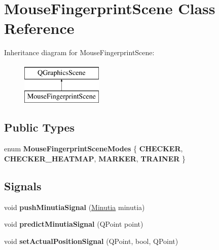 \hypertarget{class_mouse_fingerprint_scene}{}\section{Mouse\+Fingerprint\+Scene Class Reference}
\label{class_mouse_fingerprint_scene}
Inheritance diagram for Mouse\+Fingerprint\+Scene\+:\begin{figure}[H]
\begin{center}
\leavevmode
\includegraphics[height=2.000000cm]{class_mouse_fingerprint_scene}
\end{center}
\end{figure}
\subsection*{Public Types}
\begin{DoxyCompactItemize}
\item 
\mbox{\label{class_mouse_fingerprint_scene_a1fd25b04dde62c0c5ea8fc6c61a25596}} 
enum {\bfseries Mouse\+Fingerprint\+Scene\+Modes} \{ {\bfseries C\+H\+E\+C\+K\+ER}, 
{\bfseries C\+H\+E\+C\+K\+E\+R\+\_\+\+H\+E\+A\+T\+M\+AP}, 
{\bfseries M\+A\+R\+K\+ER}, 
{\bfseries T\+R\+A\+I\+N\+ER}
 \}
\end{DoxyCompactItemize}
\subsection*{Signals}
\begin{DoxyCompactItemize}
\item 
\mbox{\label{class_mouse_fingerprint_scene_ad8fea299e9d535defe84618f6b36059a}} 
void {\bfseries push\+Minutia\+Signal} (\mbox{\hyperlink{class_minutia}{Minutia}} minutia)
\item 
\mbox{\label{class_mouse_fingerprint_scene_a6091550d4b052dbb2342d58ec6e840b1}} 
void {\bfseries predict\+Minutia\+Signal} (Q\+Point point)
\item 
\mbox{\label{class_mouse_fingerprint_scene_afa954f2a2ab304daf78abbcd2110dcc1}} 
void {\bfseries set\+Actual\+Position\+Signal} (Q\+Point, bool, Q\+Point)
\end{DoxyCompactItemize}
